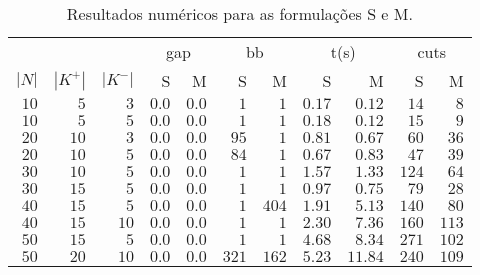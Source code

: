 \documentclass{article}
\begin{document}
\begin{table}[h]
	\centering
	\caption{Resultados numéricos para as formulações S e M.\label{tab:q3-table}}
	\begin{tabular}[h]{rrrrrrrrrrr}
		\toprule
		\multicolumn{3}{c}{}      & \multicolumn{2}{c}{gap}       & \multicolumn{2}{c}{bb}        & \multicolumn{2}{c}{t(s)} & \multicolumn{2}{c}{cuts}                                                    \\
		\cmidrule(lr){4-5} \cmidrule(lr){6-7} \cmidrule(lr){8-9} \cmidrule(lr){10-11}
		\multicolumn{1}{c}{$|N|$} & \multicolumn{1}{c}{$|K^{+}|$} & \multicolumn{1}{c}{$|K^{-}|$} & S                        & M                        & S     & M     & S      & M       & S     & M     \\
		\midrule
		$10$                      & $5$                           & $3$                           & $0.0$                    & $0.0$                    & $1$   & $1$   & $0.17$ & $0.12$  & $14$  & $8$   \\
		$10$                      & $5$                           & $5$                           & $0.0$                    & $0.0$                    & $1$   & $1$   & $0.18$ & $0.12$  & $15$  & $9$   \\
		$20$                      & $10$                          & $3$                           & $0.0$                    & $0.0$                    & $95$  & $1$   & $0.81$ & $0.67$  & $60$  & $36$  \\
		$20$                      & $10$                          & $5$                           & $0.0$                    & $0.0$                    & $84$  & $1$   & $0.67$ & $0.83$  & $47$  & $39$  \\
		$30$                      & $10$                          & $5$                           & $0.0$                    & $0.0$                    & $1$   & $1$   & $1.57$ & $1.33$  & $124$ & $64$  \\
		$30$                      & $15$                          & $5$                           & $0.0$                    & $0.0$                    & $1$   & $1$   & $0.97$ & $0.75$  & $79$  & $28$  \\
		$40$                      & $15$                          & $5$                           & $0.0$                    & $0.0$                    & $1$   & $404$ & $1.91$ & $5.13$  & $140$ & $80$  \\
		$40$                      & $15$                          & $10$                          & $0.0$                    & $0.0$                    & $1$   & $1$   & $2.30$ & $7.36$  & $160$ & $113$ \\
		$50$                      & $15$                          & $5$                           & $0.0$                    & $0.0$                    & $1$   & $1$   & $4.68$ & $8.34$  & $271$ & $102$ \\
		$50$                      & $20$                          & $10$                          & $0.0$                    & $0.0$                    & $321$ & $162$ & $5.23$ & $11.84$ & $240$ & $109$ \\
		\bottomrule
	\end{tabular}
\end{table}
\end{document}
